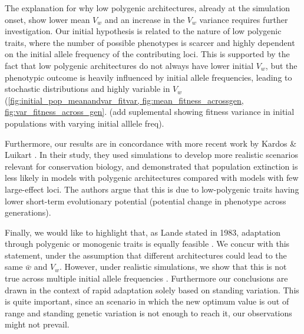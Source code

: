 \documentclass{article}
\begin{document}
The explanation for why low polygenic architectures, already at the simulation onset, show lower mean $V_w$ and an increase in the $V_w$ variance requires further investigation. Our initial hypothesis is related to the nature of low polygenic traits, where the number of possible phenotypes is scarcer and highly dependent on the initial allele frequency of the contributing loci. This is supported by the fact that low polygenic architectures do not always have lower initial $V_w$, but the phenotypic outcome is heavily influenced by initial allele frequencies, leading to stochastic distributions and highly variable in $V_w$ (\ref{fig:initial_pop_meanandvar_fitvar, fig:mean_fitness_acrossgen, fig:var_fitness_across_gen}. (add suplemental showing fitness variance in initial populations with varying initial alllele freq).

Furthermore, our results are in concordance with more recent work by Kardos \& Luikart \citep{Kardos2021-jd}. In their study, they used simulations to develop more realistic scenarios relevant for conservation biology, and demonstrated that population extinction is less likely in models with polygenic architectures compared with models with few large-effect loci. The authors argue that this is due to low-polygenic traits having lower short-term evolutionary potential (potential change in phenotype across generations).

Finally, we would like to highlight that, as Lande stated in 1983, adaptation through polygenic or monogenic traits is equally feasible \citep{Lande1983-kz}. We concur with this statement, under the assumption that different architectures could lead to the same $\bar{w}$ and $V_w$. However, under realistic simulations, we show that this is not true across multiple initial allele frequencies . Furthermore our conclusions are drawn in the context of rapid adaptation solely based on standing variation. This is quite important, since an scenario in which the new optimum value is out of range and standing genetic variation is not enough to reach it, our observations might not prevail. 
\end{document}
